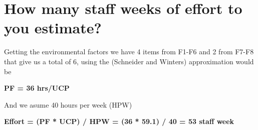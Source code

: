 \section{How many staff weeks of effort to you estimate?}
Getting the environmental factors we have 4 items from F1-F6 and 2 from F7-F8 that give us a total of 6, using the (Schneider and Winters) approximation would be \newline\newline

\textbf{PF = 36 hrs/UCP }\newline\newline

\noindent
And we asume 40 hours per week (HPW) \newline\newline


\textbf{Effort = (PF * UCP) / HPW = (36 * 59.1) / 40 = 53 staff week}
